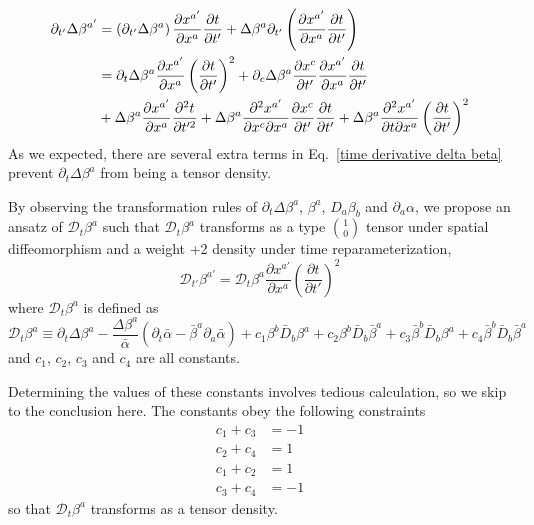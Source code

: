 \documentclass[letterpaper,nofootinbib,prd,amsmath,onecolumn]{revtex4-1}
\begin{document}
\begin{align}\label{time derivative delta beta} 
\partial_{t'}\Delta \beta^{a'} & = \left(\partial_{t'}\Delta \beta^{a}\right)\frac{\partial x^{a'}}{\partial x^{a}}\frac{\partial t}{\partial t'} + \Delta \beta^{a}\partial_{t'}\left(\frac{\partial x^{a'}}{\partial x^{a}}\frac{\partial t}{\partial t'}\right)\notag\\
& = \partial_{t}\Delta \beta^{a}\frac{\partial x^{a'}}{\partial x^{a}}\left(\frac{\partial t}{\partial t'}\right)^{2} + \partial_{c}\Delta \beta^{a}\frac{\partial x^{c}}{\partial t'}\frac{\partial x^{a'}}{\partial x^{a}}\frac{\partial t}{\partial t'}\notag\\
& + \Delta \beta^{a}\frac{\partial x^{a'}}{\partial x^{a}}\frac{\partial^{2}t}{\partial t'^{2}} + \Delta \beta^{a}\frac{\partial^{2} x^{a'}}{\partial x^{c}\partial x^{a}}\frac{\partial x^{c}}{\partial t'}\frac{\partial t}{\partial t'} + \Delta \beta^{a}\frac{\partial^{2}x^{a'}}{\partial t\partial x^{a}}\left(\frac{\partial t}{\partial t'}\right)^{2}
\end{align}
As we expected, there are several extra terms in Eq.~\ref{time derivative delta beta} prevent $\partial_{t}\Delta\beta^{a}$ from being a tensor density. 

By observing the transformation rules of $\partial_{t}\Delta\beta^{a}$, $\beta^{a}$, $D_{a}\beta_{b}$ and $\partial_{a}\alpha$, we propose an ansatz of $\mathscr{D}_{t}\beta^{a}$ such that $\mathscr{D}_{t}\beta^{a}$ transforms as a type $1 \choose 0$ tensor under spatial diffeomorphism and a weight +2 density under time reparameterization, 
\begin{equation}
\mathscr{D}_{t'}\beta^{a'} = \mathscr{D}_{t}\beta^{a}\frac{\partial x^{a'}}{\partial x^{a}}\left(\frac{\partial t}{\partial t'}\right)^{2}
\end{equation}
where $\mathscr{D}_{t}\beta^{a}$ is defined as
\begin{equation}
\mathscr{D}_{t}\beta^{a} \equiv \partial_{t}\Delta \beta^{a} - \frac{\Delta \beta^{a}}{{\bar \alpha}}(\partial_{t}{\bar \alpha} - {\bar \beta}^{a}\partial_{a}{\bar \alpha}) + c_{1}\beta^{b}{\bar D}_{b}\beta^{a} + c_{2}\beta^{b}{\bar D}_{b}{\bar \beta}^{a} + c_{3}{\bar \beta}^{b}{\bar D}_{b}\beta^{a} + c_{4}{\bar \beta}^{b}{\bar D}_{b}{\bar \beta}^{a}
\end{equation}
and $c_{1}$, $c_{2}$, $c_{3}$ and $c_{4}$ are all constants. 

Determining the values of these constants involves tedious calculation, so we skip to the conclusion here. The constants obey the following constraints
\begin{align*}
c_{1} + c_{3} & = -1\\
c_{2} + c_{4} & = 1\\
c_{1} + c_{2} & = 1\\
c_{3} + c_{4} & = -1 
\end{align*}
so that $\mathscr{D}_{t} \beta^{a}$ transforms as a tensor density. 
\end{document}
